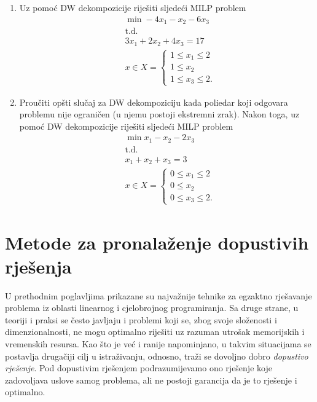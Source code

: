 \documentclass[a4paper, utf8, 11pt, colorlinks]{book}
\theoremstyle{definition}
\begin{document}
\begin{enumerate}
\item %
	Uz pomoć   DW dekompozicije riješiti sljedeći MILP problem
\begin{align*}
	 &\min -4x_1 - x_2 - 6 x_3 \\
	 &\mbox{t.d.} \\
	 & 3 x_1 + 2 x_2 + 4 x_3 = 17 \\
	 & x \in X = \begin{cases}
	 	1 \leq x_1 \leq 2 \\
	 	1 \leq x_2 \\
	    1 \leq x_3 \leq 2. 
	 \end{cases}
\end{align*}
\item %
    Proučiti opšti slučaj za DW dekompoziciju kada poliedar koji odgovara problemu nije ograničen (u njemu postoji ekstremni zrak). Nakon toga, uz pomoć DW dekompozicije riješiti sljedeći MILP problem
	\begin{align*}
		 &\min x_1 - x_2 - 2 x_3 \\
		 &\mbox{t.d.} \\
		 & x_1 + x_2 + x_3 = 3 \\
		 & x \in X = \begin{cases}
		 	        0 \leq x_1 \leq 2 \\
		 	        0 \leq x_2 \\
		 	        0 \leq x_3 \leq 2. 
		 \end{cases}
	\end{align*}

\end{enumerate}



 \chapter{Metode za pronalaženje dopustivih rješenja}\label{chp:heuristike}
 
 U prethodnim poglavljima prikazane su najvažnije tehnike za egzaktno rješavanje problema iz oblasti linearnog i cjelobrojnog programiranja. Sa druge strane, u teoriji i praksi se često javljaju i problemi koji se, zbog svoje složenosti i dimenzionalnosti, ne mogu optimalno riješiti uz razuman utrošak memorijskih i vremenskih resursa. Kao što je već i ranije napominjano, u takvim situacijama se postavlja drugačiji cilj u istraživanju, odnosno, traži se dovoljno dobro \emph{dopustivo rješenje}. Pod dopustivim rješenjem podrazumijevamo ono rješenje koje zadovoljava uslove samog problema, ali ne postoji garancija da je to rješenje i optimalno.
 
\end{document}
